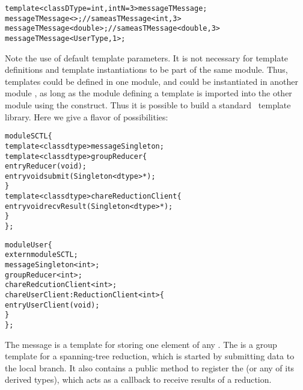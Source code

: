 \begin{alltt}
  template <class DType=int, int N=3> message TMessage;
  message TMessage<>; // same as TMessage<int,3>
  message TMessage<double>; // same as TMessage<double, 3>
  message TMessage<UserType, 1>;
\end{alltt}

Note the use of default template parameters. It is not necessary for
template definitions and template instantiations to be part of the
same module.  Thus, templates could be defined in one module, and
could be instantiated in another module , as long as the
module defining a template is imported into the other module using the
 construct. Thus it is possible to build a standard
\charmpp\ template library. Here we give a flavor of possibilities:

\begin{alltt}
module SCTL \{
  template <class dtype> message  Singleton;
  template <class dtype> group Reducer \{
    entry Reducer(void);
    entry void submit(Singleton<dtype> *);
  \}
  template <class dtype> chare ReductionClient \{
    entry void recvResult(Singleton<dtype> *);
  \}
\};

module User \{
  extern module SCTL;
  message Singleton<int>;
  group Reducer<int>;
  chare RedcutionClient<int>;
  chare UserClient : ReductionClient<int> \{
    entry UserClient(void);
  \}
\};
\end{alltt}

The  message is a template for storing one element of any
. The  is a group template for a spanning-tree reduction,
which is started by submitting data to the local branch. It also contains a
public method to register the  (or any of its derived
types), which acts as a callback to receive results of a reduction.

